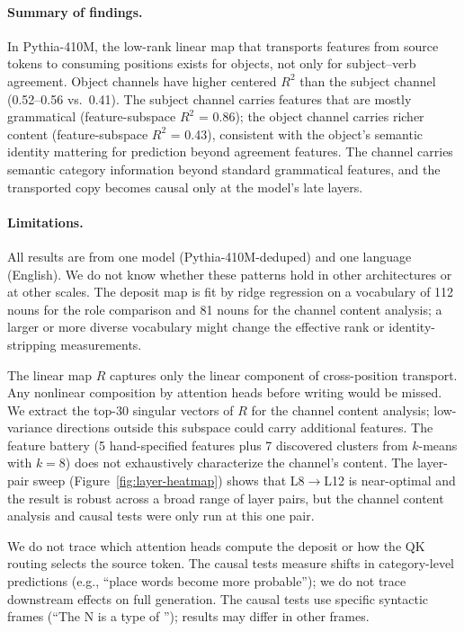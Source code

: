 \documentclass[11pt,a4paper]{article}
\begin{document}
\paragraph{Summary of findings.}
In Pythia-410M, the low-rank linear map that transports features from source tokens to
consuming positions exists for objects, not only for subject--verb agreement.
Object channels have higher centered $R^2$ than the subject channel (0.52--0.56 vs.\ 0.41).
The subject channel carries features that are mostly grammatical (feature-subspace $R^2$ =
0.86); the object channel carries richer content (feature-subspace $R^2$ = 0.43), consistent
with the object's semantic identity mattering for prediction beyond agreement features.
The channel carries semantic category information beyond standard grammatical features, and
the transported copy becomes causal only at the model's late layers.

\paragraph{Limitations.}
All results are from one model (Pythia-410M-deduped) and one language (English). We do not
know whether these patterns hold in other architectures or at other scales. The deposit map
is fit by ridge regression on a vocabulary of 112 nouns for the role comparison and 81 nouns
for the channel content analysis; a larger or more diverse vocabulary might change the
effective rank or identity-stripping measurements.

The linear map $R$ captures only the linear component of cross-position transport. Any
nonlinear composition by attention heads before writing would be missed. We extract the
top-30 singular vectors of $R$ for the channel content analysis; low-variance directions
outside this subspace could carry additional features. The feature battery (5 hand-specified
features plus 7 discovered clusters from $k$-means with $k=8$) does not exhaustively
characterize the channel's content. The layer-pair sweep
(Figure~\ref{fig:layer-heatmap}) shows that L8$\to$L12 is near-optimal and the result is
robust across a broad range of layer pairs, but the channel content analysis and causal tests
were only run at this one pair.

We do not trace which attention heads compute the deposit or how the QK routing selects the
source token. The causal tests measure shifts in category-level predictions (e.g., ``place
words become more probable''); we do not trace downstream effects on full generation. The
causal tests use specific syntactic frames (``The N is a type of \underline{\hspace{1cm}}'');
results may differ in other frames.
\end{document}
